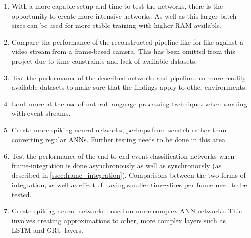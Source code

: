 \begin{enumerate}
    \item With a more capable setup and time to test the networks, there is the opportunity to create more intensive networks. As well as this larger batch sizes can be used for more stable training with higher RAM available.
    \item Compare the performance of the reconstructed pipeline like-for-like against a video stream from a frame-based camera. This has been omitted from this project due to time constraints and lack of available datasets.
    \item Test the performance of the described networks and pipelines on more readily available datasets to make sure that the findings apply to other environments.
    \item Look more at the use of natural language processing techniques when working with event streams.
    \item Create more spiking neural networks, perhaps from scratch rather than converting regular ANNs. Further testing needs to be done in this area.
    \item Test the performance of the end-to-end event classification networks when frame-integration is done asynchronously as well as synchronously (as described in \cref{ssec:frame_integration}). Comparisons between the two forms of integration, as well as effect of having smaller time-slices per frame need to be tested.
    \item Create spiking neural networks based on more complex ANN networks. This involves creating approximations to other, more complex layers such as LSTM and GRU layers.
\end{enumerate}